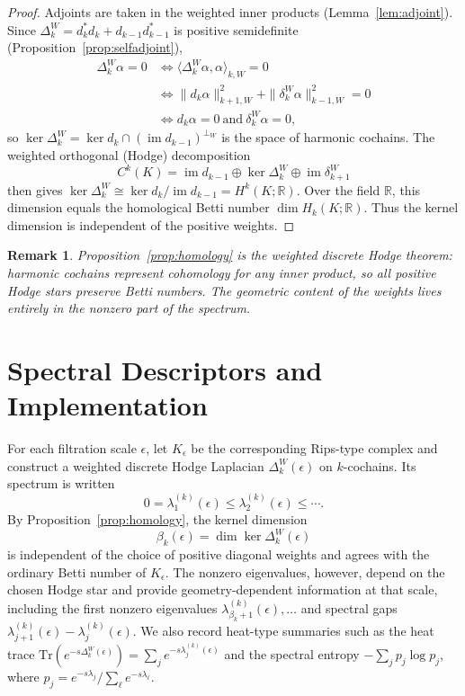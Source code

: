 \documentclass[11pt]{amsart}
\theoremstyle{plain}
\newtheorem{remark}[theorem]{Remark}
\newcommand{\R}{\mathbb{R}}
\begin{document}
\begin{proof}
Adjoints are taken in the weighted inner products (Lemma~\ref{lem:adjoint}). Since $\Delta_k^W
=d_k^{*}d_k+d_{k-1}d_{k-1}^{*}$ is positive semidefinite (Proposition~\ref{prop:selfadjoint}),
\[
\begin{aligned}
\Delta_k^W\alpha=0
&\iff
\langle\Delta_k^W\alpha,\alpha\rangle_{k,W}=0\\
&\iff
\|d_k\alpha\|_{k+1,W}^2+\|\delta_k^{W}\alpha\|_{k-1,W}^2=0\\
&\iff
d_k\alpha=0\ \text{and}\ \delta_k^{W}\alpha=0,
\end{aligned}
\]
so $\ker\Delta_k^W=\ker d_k\cap(\operatorname{im}d_{k-1})^{\perp_W}$ is the space of harmonic
cochains. The weighted orthogonal (Hodge) decomposition
\[
C^k(K)=\operatorname{im}d_{k-1}\oplus\ker\Delta_k^W\oplus\operatorname{im}\delta_{k+1}^{W}
\]
then gives $\ker\Delta_k^W\cong\ker d_k/\operatorname{im}d_{k-1}=H^k(K;\R)$. Over the field
$\R$, this dimension equals the homological Betti number $\dim H_k(K;\R)$. Thus the kernel
dimension is independent of the positive weights.
\end{proof}

\begin{remark}
Proposition~\ref{prop:homology} is the weighted discrete Hodge theorem: harmonic cochains represent
cohomology for any inner product, so all positive Hodge stars preserve Betti numbers. The geometric
content of the weights lives entirely in the nonzero part of the spectrum.
\end{remark}

\section{Spectral Descriptors and Implementation}
\label{sec:descriptors}

For each filtration scale $\epsilon$, let $K_\epsilon$ be the corresponding Rips-type complex and
construct a weighted discrete Hodge Laplacian $\Delta_k^W(\epsilon)$ on $k$-cochains. Its spectrum
is written
\[
0=\lambda_1^{(k)}(\epsilon)\leq \lambda_2^{(k)}(\epsilon)\leq \cdots.
\]
By Proposition~\ref{prop:homology}, the kernel dimension
\[
\beta_k(\epsilon)=\dim\ker \Delta_k^W(\epsilon)
\]
is independent of the choice of positive diagonal weights and agrees with the ordinary Betti number
of $K_\epsilon$. The nonzero eigenvalues, however, depend on the chosen Hodge star and provide
geometry-dependent information at that scale, including the first nonzero eigenvalues
$\lambda_{\beta_k+1}^{(k)}(\epsilon),\dots$ and spectral gaps
$\lambda_{j+1}^{(k)}(\epsilon)-\lambda_j^{(k)}(\epsilon)$. We also record heat-type summaries such
as the heat trace
$\mathrm{Tr}(e^{-s\Delta_k^W(\epsilon)})=\sum_j e^{-s\lambda_j^{(k)}(\epsilon)}$ and the spectral
entropy $-\sum_j p_j\log p_j$, where
$p_j=e^{-s\lambda_j}/\sum_\ell e^{-s\lambda_\ell}$.
\end{document}
